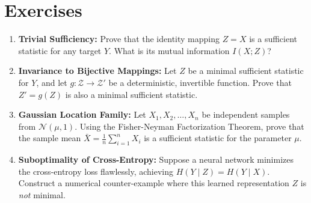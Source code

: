 \section*{Exercises}
\begin{enumerate}
    \item \textbf{Trivial Sufficiency:} Prove that the identity mapping $Z = X$ is a sufficient statistic for any target $Y$. What is its mutual information $I(X; Z)$?
    \item \textbf{Invariance to Bijective Mappings:} Let $Z$ be a minimal sufficient statistic for $Y$, and let $g: \mathcal{Z} \to \mathcal{Z}'$ be a deterministic, invertible function. Prove that $Z' = g(Z)$ is also a minimal sufficient statistic.
    \item \textbf{Gaussian Location Family:} Let $X_1, X_2, \dots, X_n$ be independent samples from $\mathcal{N}(\mu, 1)$. Using the Fisher-Neyman Factorization Theorem, prove that the sample mean $\bar{X} = \frac{1}{n} \sum_{i=1}^n X_i$ is a sufficient statistic for the parameter $\mu$.
    \item \textbf{Suboptimality of Cross-Entropy:} Suppose a neural network minimizes the cross-entropy loss flawlessly, achieving $H(Y \mid Z) = H(Y \mid X)$. Construct a numerical counter-example where this learned representation $Z$ is \emph{not} minimal.
\end{enumerate}

